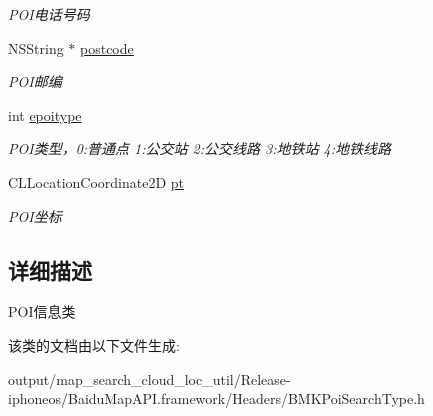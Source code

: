\begin{DoxyCompactItemize}
\begin{DoxyCompactList}\small\item\em P\+O\+I电话号码 \end{DoxyCompactList}\item 
\hypertarget{interface_b_m_k_poi_info_a696c50cfef411e4c8aa4a53693c26dc5}{}N\+S\+String $\ast$ \hyperlink{interface_b_m_k_poi_info_a696c50cfef411e4c8aa4a53693c26dc5}{postcode}\label{interface_b_m_k_poi_info_a696c50cfef411e4c8aa4a53693c26dc5}

\begin{DoxyCompactList}\small\item\em P\+O\+I邮编 \end{DoxyCompactList}\item 
\hypertarget{interface_b_m_k_poi_info_ada3ccb40708069fe5d82414af8de1ab5}{}int \hyperlink{interface_b_m_k_poi_info_ada3ccb40708069fe5d82414af8de1ab5}{epoitype}\label{interface_b_m_k_poi_info_ada3ccb40708069fe5d82414af8de1ab5}

\begin{DoxyCompactList}\small\item\em P\+O\+I类型，0\+:普通点 1\+:公交站 2\+:公交线路 3\+:地铁站 4\+:地铁线路 \end{DoxyCompactList}\item 
\hypertarget{interface_b_m_k_poi_info_a6ace0b9f9462c1695317654d92c3795a}{}C\+L\+Location\+Coordinate2\+D \hyperlink{interface_b_m_k_poi_info_a6ace0b9f9462c1695317654d92c3795a}{pt}\label{interface_b_m_k_poi_info_a6ace0b9f9462c1695317654d92c3795a}

\begin{DoxyCompactList}\small\item\em P\+O\+I坐标 \end{DoxyCompactList}\end{DoxyCompactItemize}


\subsection{详细描述}
P\+O\+I信息类 

该类的文档由以下文件生成\+:\begin{DoxyCompactItemize}
\item 
output/map\+\_\+search\+\_\+cloud\+\_\+loc\+\_\+util/\+Release-\/iphoneos/\+Baidu\+Map\+A\+P\+I.\+framework/\+Headers/B\+M\+K\+Poi\+Search\+Type.\+h\end{DoxyCompactItemize}
